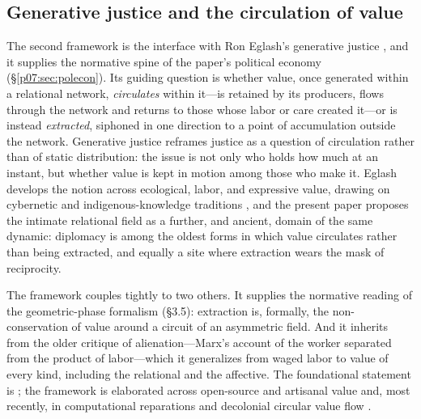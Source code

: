 \documentclass[11pt,a4paper]{article}
\newcommand{\xref}[1]{\textcolor{rose}{\S\ref{#1}}}
\newcommand{\pinkref}[1]{\textcolor{rose}{#1}}
\begin{document}
\subsection{Generative justice and the circulation of value}
The second framework is the interface with Ron Eglash's generative justice \parencite{eglash2016intro}, and it supplies the normative spine of the paper's political economy (\xref{p07:sec:polecon}). Its guiding question is whether value, once generated within a relational network, \emph{circulates} within it---is retained by its producers, flows through the network and returns to those whose labor or care created it---or is instead \emph{extracted}, siphoned in one direction to a point of accumulation outside the network. Generative justice reframes justice as a question of circulation rather than of static distribution: the issue is not only who holds how much at an instant, but whether value is kept in motion among those who make it. Eglash develops the notion across ecological, labor, and expressive value, drawing on cybernetic and indigenous-knowledge traditions \parencite{eglash2014garvey,eglash2017engineering,eglash2024computational}, and the present paper proposes the intimate relational field as a further, and ancient, domain of the same dynamic: diplomacy is among the oldest forms in which value circulates rather than being extracted, and equally a site where extraction wears the mask of reciprocity.

The framework couples tightly to two others. It supplies the normative reading of the geometric-phase formalism (\pinkref{§3.5}): extraction is, formally, the non-conservation of value around a circuit of an asymmetric field. And it inherits from the older critique of alienation---Marx's account of the worker separated from the product of labor---which it generalizes from waged labor to value of every kind, including the relational and the affective. The foundational statement is \textcite{eglash2016intro}; the framework is elaborated across open-source and artisanal value \parencite{eglash2014garvey,eglash2017engineering} and, most recently, in computational reparations and decolonial circular value flow \parencite{eglash2024computational}.
\end{document}
